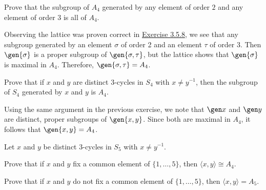\begin{exercise}\label{ex3.5.14}
    Prove that the subgroup of $A_4$ generated by any element of order $2$ and any element of order $3$ is all of $A_4$.
\end{exercise}

\begin{sol}
    Observing the lattice was proven correct in \hyperref[ex3.5.8]{Exercise 3.5.8}, we see that any subgroup generated by an element $\sigma$ of order 2 and an element $\tau$ of order 3. Then $\gen{\sigma}$ is a proper subgroup of $\gen{\sigma, \tau}$, but the lattice shows that $\gen{\sigma}$ is maximal in $A_4$. Therefore, $\gen{\sigma, \tau} = A_4$.
\end{sol}

\begin{exercise}\label{ex3.5.15}
    Prove that if $x$ and $y$ are distinct $3$-cycles in $S_4$ with $x \ne y^{-1}$, then the subgroup of $S_4$ generated by $x$ and $y$ is $A_4$.
\end{exercise}

\begin{sol}
    Using the same argument in the previous exercise, we note that $\gen x$ and $\gen y$ are distinct, proper subgroups of $\gen{x, y}$. Since both are maximal in $A_4$, it follows that $\gen{x, y} = A_4$.
\end{sol}

\begin{exercise}\label{ex3.5.16}
    Let $x$ and $y$ be distinct $3$-cycles in $S_5$ with $x\ne y^{-1}$.
    \begin{subproblems}
    \item Prove that if $x$ and $y$ fix a common element of $\{1,\dots,5\}$, then $\langle x,y\rangle \cong A_4$.
    \item Prove that if $x$ and $y$ do not fix a common element of $\{1,\dots,5\}$, then $\langle x,y\rangle = A_5$.
    \end{subproblems}
\end{exercise}

